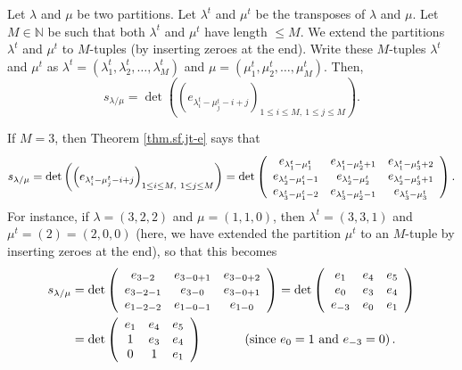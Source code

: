 \begin{theorem}
\label{thm.sf.jt-e}Let $\lambda$ and $\mu$ be
two partitions. Let $\lambda^{t}$ and $\mu^{t}$ be the transposes of $\lambda$
and $\mu$. Let $M\in\mathbb{N}$ be such that both $\lambda^{t}$ and $\mu^{t}$
have length $\leq M$. We extend the partitions $\lambda^{t}$ and $\mu^{t}$ to
$M$-tuples (by inserting zeroes at the end). Write these $M$-tuples
$\lambda^{t}$ and $\mu^{t}$ as $\lambda^{t}=\left(  \lambda_{1}^{t}%
,\lambda_{2}^{t},\ldots,\lambda_{M}^{t}\right)  $ and $\mu=\left(  \mu_{1}%
^{t},\mu_{2}^{t},\ldots,\mu_{M}^{t}\right)  $. Then,%
\[
s_{\lambda/\mu}=\det\left(  \left(  e_{\lambda_{i}^{t}-\mu_{j}^{t}%
-i+j}\right)  _{1\leq i\leq M,\ 1\leq j\leq M}\right)  .
\]

\end{theorem}

\begin{example}
If $M=3$, then Theorem \ref{thm.sf.jt-e} says that%
\[
s_{\lambda/\mu}=\det\left(  \left(  e_{\lambda_{i}^{t}-\mu_{j}^{t}%
-i+j}\right)  _{1\leq i\leq M,\ 1\leq j\leq M}\right)  =\det\left(
\begin{array}
[c]{ccc}%
e_{\lambda_{1}^{t}-\mu_{1}^{t}} & e_{\lambda_{1}^{t}-\mu_{2}^{t}+1} &
e_{\lambda_{1}^{t}-\mu_{3}^{t}+2}\\
e_{\lambda_{2}^{t}-\mu_{1}^{t}-1} & e_{\lambda_{2}^{t}-\mu_{2}^{t}} &
e_{\lambda_{2}^{t}-\mu_{3}^{t}+1}\\
e_{\lambda_{3}^{t}-\mu_{1}^{t}-2} & e_{\lambda_{3}^{t}-\mu_{2}^{t}-1} &
e_{\lambda_{3}^{t}-\mu_{3}^{t}}%
\end{array}
\right)  .
\]
For instance, if $\lambda=\left(  3,2,2\right)  $ and $\mu=\left(
1,1,0\right)  $, then $\lambda^{t}=\left(  3,3,1\right)  $ and $\mu
^{t}=\left(  2\right)  =\left(  2,0,0\right)  $ (here, we have extended the
partition $\mu^{t}$ to an $M$-tuple by inserting zeroes at the end), so that
this becomes
\begin{align*}
s_{\lambda/\mu}  &  =\det\left(
\begin{array}
[c]{ccc}%
e_{3-2} & e_{3-0+1} & e_{3-0+2}\\
e_{3-2-1} & e_{3-0} & e_{3-0+1}\\
e_{1-2-2} & e_{1-0-1} & e_{1-0}%
\end{array}
\right)  =\det\left(
\begin{array}
[c]{ccc}%
e_{1} & e_{4} & e_{5}\\
e_{0} & e_{3} & e_{4}\\
e_{-3} & e_{0} & e_{1}%
\end{array}
\right) \\
&  =\det\left(
\begin{array}
[c]{ccc}%
e_{1} & e_{4} & e_{5}\\
1 & e_{3} & e_{4}\\
0 & 1 & e_{1}%
\end{array}
\right)  \ \ \ \ \ \ \ \ \ \ \left(  \text{since }e_{0}=1\text{ and }%
e_{-3}=0\right)  .
\end{align*}

\end{example}

